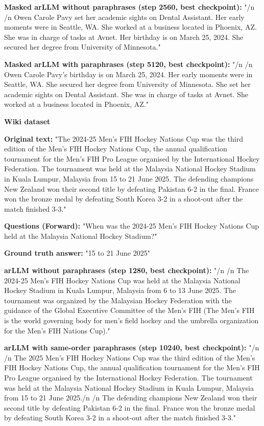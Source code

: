 {\textbf{Masked arLLM without paraphrases (step 2560, best checkpoint):} "\slash n \slash n Owen Carole Pavy set her academic sights on Dental Assistant. Her early moments were in Seattle, WA. She worked at a business located in Phoenix, AZ. She was in charge of tasks at Avnet. Her birthday is on March 25, 2024. She secured her degree from University of Minnesota."

\textbf{Masked arLLM with paraphrases (step 5120, best checkpoint):} "\slash n \slash n Owen Carole Pavy's birthday is on March 25, 2024. Her early moments were in Seattle, WA. She secured her degree from University of Minnesota. She set her academic sights on Dental Assistant. She was in charge of tasks at Avnet. She worked at a business located in Phoenix, AZ."

\textbf{Wiki dataset}

\textbf{Original text:} "The 2024-25 Men's FIH Hockey Nations Cup was the third edition of the Men's FIH Hockey Nations Cup, the annual qualification tournament for the Men's FIH Pro League organised by the International Hockey Federation. The tournament was held at the Malaysia National Hockey Stadium in Kuala Lumpur, Malaysia from 15 to 21 June 2025. The defending champions New Zealand won their second title by defeating Pakistan 6-2 in the final. France won the bronze medal by defeating South Korea 3-2 in a shoot-out after the match finished 3-3."

\textbf{Questions (Forward):} "When was the 2024-25 Men's FIH Hockey Nations Cup held at the Malaysia National Hockey Stadium?"

\textbf{Ground truth answer:} "15 to 21 June 2025"

\textbf{arLLM without paraphrases (step 1280, best checkpoint):} "\slash n \slash n The 2024-25 Men's FIH Hockey Nations Cup was held at the Malaysia National Hockey Stadium in Kuala Lumpur, Malaysia from 6 to 13 June 2025. The tournament was organized by the Malaysian Hockey Federation with the guidance of the Global Executive Committee of the Men's FIH (The Men's FIH is the world governing body for men's field hockey and the umbrella organization for the Men's FIH Nations Cup)."

\textbf{arLLM with same-order paraphrases (step 10240, best checkpoint):} "\slash n \slash n The 2025 Men's FIH Hockey Nations Cup was the third edition of the Men's FIH Hockey Nations Cup, the annual qualification tournament for the Men's FIH Pro League organised by the International Hockey Federation. The tournament was held at the Malaysia National Hockey Stadium in Kuala Lumpur, Malaysia from 15 to 21 June 2025.\slash n \slash n The defending champions New Zealand won their second title by defeating Pakistan 6-2 in the final. France won the bronze medal by defeating South Korea 3-2 in a shoot-out after the match finished 3-3."

}

